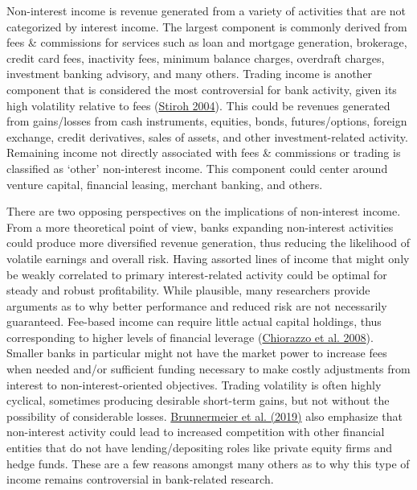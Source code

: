 \documentclass[10pt]{article} %
\begin{document}
Non-interest income is revenue generated from a variety of activities that are not categorized by interest income. The largest component is commonly derived from fees \& commissions for services such as loan and mortgage generation, brokerage, credit card fees, inactivity fees, minimum balance charges, overdraft charges, investment banking advisory, and many others. Trading income is another component that is considered the most controversial for bank activity, given its high volatility relative to fees (\hyperlink{Stiroh}{Stiroh 2004}). This could be revenues generated from gains/losses from cash instruments, equities, bonds, futures/options, foreign exchange, credit derivatives, sales of assets, and other investment-related activity. Remaining income not directly associated with fees \& commissions or trading is classified as `other' non-interest income. This component could center around venture capital, financial leasing, merchant banking, and others.

There are two opposing perspectives on the implications of non-interest income. From a more theoretical point of view, banks expanding non-interest activities could produce more diversified revenue generation, thus reducing the likelihood of volatile earnings and overall risk. Having assorted lines of income that might only be weakly correlated to primary interest-related activity could be optimal for steady and robust profitability. While plausible, many researchers provide arguments as to why better performance and reduced risk are not necessarily guaranteed. Fee-based income can require little actual capital holdings, thus corresponding to higher levels of financial leverage (\hyperlink{Chiorazzo}{Chiorazzo et al. 2008}). Smaller banks in particular might not have the market power to increase fees when needed and/or sufficient funding necessary to make costly adjustments from interest to non-interest-oriented objectives. Trading volatility is often highly cyclical, sometimes producing desirable short-term gains, but not without the possibility of considerable losses. \hyperlink{Brunner}{Brunnermeier et al. (2019)} also emphasize that non-interest activity could lead to increased competition with other financial entities that do not have lending/depositing roles like private equity firms and hedge funds. These are a few reasons amongst many others as to why this type of income remains controversial in bank-related research.
\end{document}
